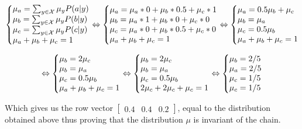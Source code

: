 \documentclass{article}
\begin{document}
\begin{equation}
    \left\{\begin{array}{@{}l@{}}
        \mu_{a} = \sum_{y \in \mathcal{X}} \mu_{y}P(a | y)\\
        \mu_{b} = \sum_{y \in \mathcal{X}} \mu_{y}P(b | y)\\
        \mu_{c} = \sum_{y \in \mathcal{X}} \mu_{y}P(c | y)\\
        \mu_{a} + \mu_{b} + \mu_{c} = 1\\
    \end{array}\right.\notag
    \Leftrightarrow
    \left\{\begin{array}{@{}l@{}}
        \mu_{a} = \mu_{a} * 0 + \mu_{b} * 0.5 + \mu_{c} * 1\\
        \mu_{b} = \mu_{a} * 1 + \mu_{b} * 0 + \mu_{c} * 0\\
        \mu_{c} = \mu_{a} * 0 + \mu_{b} * 0.5 + \mu_{c} * 0\\
        \mu_{a} + \mu_{b} + \mu_{c} = 1\\
    \end{array}\right.
    \Leftrightarrow
    \left\{\begin{array}{@{}l@{}}
        \mu_{a} = 0.5\mu_{b} + \mu_{c}\\
        \mu_{b} = \mu_{a}\\
        \mu_{c} = 0.5\mu_{b}\\
        \mu_{a} + \mu_{b} + \mu_{c} = 1\\
    \end{array}\right.
\end{equation}

\begin{equation}
    \Leftrightarrow
    \left\{\begin{array}{@{}l@{}}
        \mu_{b} = 2\mu_{c}\\
        \mu_{b} = \mu_{a}\\
        \mu_{c} = 0.5\mu_{b}\\
        \mu_{a} + \mu_{b} + \mu_{c} = 1\\
    \end{array}\right.\notag
    \Leftrightarrow
    \left\{\begin{array}{@{}l@{}}
        \mu_{b} = 2\mu_{c}\\
        \mu_{b} = \mu_{a}\\
        \mu_{c} = 0.5\mu_{b}\\
        2\mu_{c} + 2\mu_{c} + \mu_{c} = 1\\
    \end{array}\right.
    \Leftrightarrow
    \left\{\begin{array}{@{}l@{}}
        \mu_{b} = 2/5\\
        \mu_{a} = 2/5\\
        \mu_{c} = 1/5\\
        \mu_{c} = 1/5\\
    \end{array}\right.
\end{equation}

\bigskip

Which gives us the row vector $\begin{bmatrix} 0.4 & 0.4 & 0.2 \end{bmatrix}$, equal to the distribution obtained above thus proving that the distribution $\mu$ is invariant of the chain.
\end{document}
